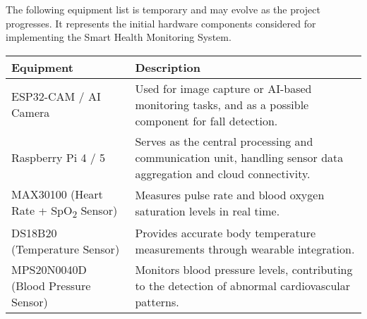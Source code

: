 The following equipment list is temporary and may evolve as the project progresses. 
It represents the initial hardware components considered for implementing the Smart Health Monitoring System.

\begin{center}
\begin{tabular}{|l|p{8cm}|}
\hline
\textbf{Equipment} & \textbf{Description} \\
\hline
ESP32-CAM / AI Camera & Used for image capture or AI-based monitoring tasks, and as a possible component for fall detection. \\
\hline
Raspberry Pi 4 / 5 & Serves as the central processing and communication unit, handling sensor data aggregation and cloud connectivity. \\
\hline
MAX30100 (Heart Rate + SpO\textsubscript{2} Sensor) & Measures pulse rate and blood oxygen saturation levels in real time. \\
\hline
DS18B20 (Temperature Sensor) & Provides accurate body temperature measurements through wearable integration. \\
\hline
MPS20N0040D (Blood Pressure Sensor) & Monitors blood pressure levels, contributing to the detection of abnormal cardiovascular patterns. \\
\hline
\end{tabular}
\end{center}
